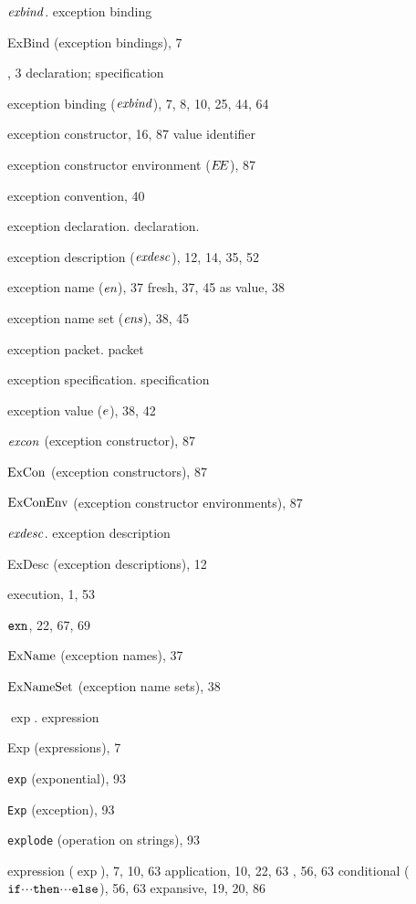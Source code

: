 \begin{theindex}
\item ${\it exbind}$. \see exception binding
\item ExBind (exception bindings), 7
\item \EXCEPTION, 3
\subitem \seealso declaration; specification
\item exception binding (${\it exbind}$), 7, 8, 10, 25, 44, 64
\item exception constructor, 16, 87
\subitem \seealso value identifier
\item exception constructor environment ($\mbox{$E\!E$}$), 87 
\item exception convention, 40
\item exception declaration. \see declaration.
\item exception description (${\it exdesc}$), 12, 14, 35, 52
\item exception name ($\mbox{\it en}$), 37
\subitem fresh, 37, 45
\subitem as value, 38
\item exception name set ($\mbox{\it ens}$), 38, 45
\item exception packet. \see packet 
\item exception specification. \see specification
\item exception value ($e$), 38, 42
\item ${\it excon}$ (exception constructor), 87
\item ${\rm ExCon}$ (exception constructors), 87
\item ${\rm ExConEnv}$ (exception constructor environments), 87
\item ${\it exdesc}$. \see exception description
\item ExDesc (exception descriptions), 12
\item execution, 1, 53
\item $\mbox{\tt exn}$, 22, 67, 69
\item ${\rm ExName}$ (exception names), 37
\item ${\rm ExNameSet}$ (exception name sets), 38
\item $\exp$. \see expression
\item Exp (expressions), 7
\item {\tt exp} (exponential), 93
\item {\tt Exp} (exception), 93
\item {\tt explode} (operation on strings), 93
\item expression ($\exp$), 7, 10, 63
\subitem application, 10, 22, 63
\subitem {}, 56, 63
\subitem conditional ($\hbox{\tt if}\mbox{$\cdot\!\cdot\!\cdot$}\hbox{\tt then}\mbox{$\cdot\!\cdot\!\cdot$}\hbox{\tt else}$), 56, 63
\subitem expansive, 19, 20, 86

\end{theindex}
